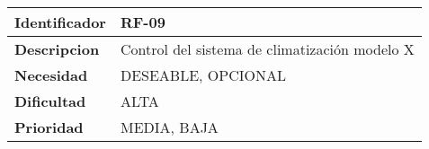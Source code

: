 \begin{center}
    \begin{tabular}{|p{2.6cm}|p{12cm}|}
    \hline
    \textbf{Identificador} & RF-09\\
    \hline
    \textbf{Descripcion} & Control del sistema de climatización modelo X\\
    \hline
    \textbf{Necesidad} & DESEABLE, OPCIONAL\\
    \hline
    \textbf{Dificultad} & ALTA\\
    \hline
    \textbf{Prioridad} & MEDIA, BAJA\\
    \hline
    \end{tabular}
\end{center}
